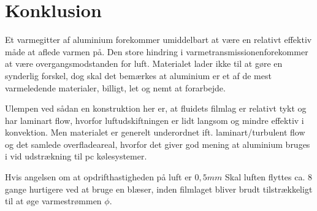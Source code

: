 \section{Konklusion}

Et varmegitter af aluminium forekommer umiddelbart at være en relativt effektiv måde at aflede varmen på. 
Den store hindring i varmetransmissionenforekommer at være overgangsmodstanden for luft. 
Materialet lader ikke til at gøre en synderlig forskel, dog skal det bemærkes at aluminium er et af de mest varmeledende materialer, billigt, let og nemt at forarbejde.

Ulempen ved sådan en konstruktion her er, at fluidets filmlag er relativt tykt og har laminart flow, hvorfor luftudskiftningen er lidt langsom og mindre effektiv i konvektion. 
Men materialet er generelt underordnet ift. laminart/turbulent flow og det samlede overfladeareal, hvorfor det giver god mening at aluminium bruges i vid udstrækning til pc kølesystemer. 

Hvis angelsen om at opdrifthastigheden på luft er $0,5mm$
Skal luften flyttes ca. 8 gange hurtigere ved at bruge en blæser, inden filmlaget bliver brudt tilstrækkeligt til at øge varmestrømmen $\phi$.
